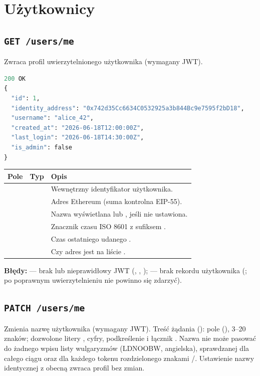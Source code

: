 \section{Użytkownicy}
\label{sec:api-users}

\subsection{\texttt{GET /users/me}}

Zwraca profil uwierzytelnionego użytkownika (wymagany JWT).

\begin{lstlisting}[language=Python]
200 OK
{
  "id": 1,
  "identity_address": "0x742d35Cc6634C0532925a3b844Bc9e7595f2bD18",
  "username": "alice_42",
  "created_at": "2026-06-18T12:00:00Z",
  "last_login": "2026-06-18T14:30:00Z",
  "is_admin": false
}
\end{lstlisting}

\begin{tabularx}{\textwidth}{llY}
\toprule
Pole & Typ & Opis \\
\midrule
{} &  & Wewnętrzny identyfikator użytkownika. \\
 &  & Adres Ethereum (suma kontrolna EIP-55). \\
 &  & Nazwa wyświetlana lub , jeśli nie ustawiona. \\
 &  & Znacznik czasu ISO 8601 z sufiksem . \\
 &  & Czas ostatniego udanego . \\
 &  & Czy adres jest na liście . \\
\bottomrule
\end{tabularx}

\textbf{Błędy:}  --- brak lub nieprawidłowy JWT (,
, );  --- brak rekordu użytkownika
(; po poprawnym uwierzytelnieniu nie powinno się zdarzyć).

\subsection{\texttt{PATCH /users/me}}

Zmienia nazwę użytkownika (wymagany JWT). Treść żądania ():
pole  (), 3--20 znaków; dozwolone litery , cyfry,
podkreślenie \code{_} i łącznik \code{-}. Nazwa nie może pasować do żadnego wpisu listy wulgaryzmów
(LDNOOBW, angielska), sprawdzanej dla całego ciągu oraz dla każdego tokenu rozdzielonego znakami
\code{_}/\code{-}. Ustawienie nazwy identycznej z obecną zwraca profil bez zmian.

